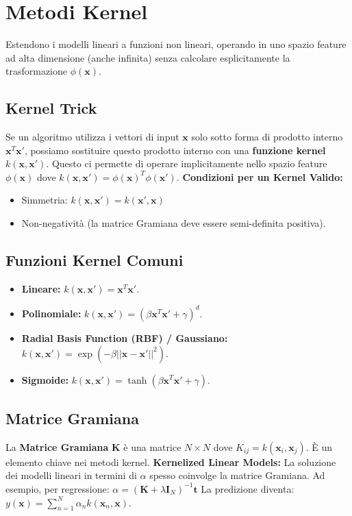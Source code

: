 \documentclass[a4paper,11pt]{article}
\begin{document}
\section{Metodi Kernel}

Estendono i modelli lineari a funzioni non lineari, operando in uno spazio feature ad alta dimensione (anche infinita) senza calcolare esplicitamente la trasformazione $\phi(\mathbf{x})$.

\subsection{Kernel Trick}
Se un algoritmo utilizza i vettori di input $\mathbf{x}$ solo sotto forma di prodotto interno $\mathbf{x}^T \mathbf{x}'$, possiamo sostituire questo prodotto interno con una \textbf{funzione kernel} $k(\mathbf{x}, \mathbf{x}')$. Questo ci permette di operare implicitamente nello spazio feature $\phi(\mathbf{x})$ dove $k(\mathbf{x}, \mathbf{x}') = \phi(\mathbf{x})^T \phi(\mathbf{x}')$.
\textbf{Condizioni per un Kernel Valido:}
\begin{itemize}
    \item Simmetria: $k(\mathbf{x}, \mathbf{x}') = k(\mathbf{x}', \mathbf{x})$
    \item Non-negatività (la matrice Gramiana deve essere semi-definita positiva).
\end{itemize}

\subsection{Funzioni Kernel Comuni}
\begin{itemize}
    \item \textbf{Lineare:} $k(\mathbf{x}, \mathbf{x}') = \mathbf{x}^T \mathbf{x}'$.
    \item \textbf{Polinomiale:} $k(\mathbf{x}, \mathbf{x}') = (\beta \mathbf{x}^T \mathbf{x}' + \gamma)^d$.
    \item \textbf{Radial Basis Function (RBF) / Gaussiano:} $k(\mathbf{x}, \mathbf{x}') = \exp(-\beta ||\mathbf{x} - \mathbf{x}'||^2)$.
    \item \textbf{Sigmoide:} $k(\mathbf{x}, \mathbf{x}') = \tanh(\beta \mathbf{x}^T \mathbf{x}' + \gamma)$.
\end{itemize}

\subsection{Matrice Gramiana}
La \textbf{Matrice Gramiana} $\mathbf{K}$ è una matrice $N \times N$ dove $K_{ij} = k(\mathbf{x}_i, \mathbf{x}_j)$. È un elemento chiave nei metodi kernel.
\textbf{Kernelized Linear Models:} La soluzione dei modelli lineari in termini di $\alpha$ spesso coinvolge la matrice Gramiana. Ad esempio, per regressione:
$\alpha = (\mathbf{K} + \lambda \mathbf{I}_N)^{-1} \mathbf{t}$
La predizione diventa: $y(\mathbf{x}) = \sum_{n=1}^N \alpha_n k(\mathbf{x}_n, \mathbf{x})$.
\end{document}
